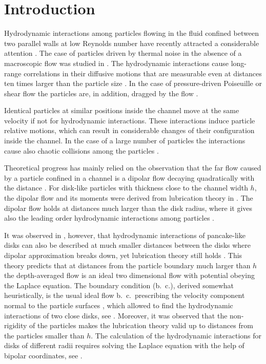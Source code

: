 \section{Introduction}

Hydrodynamic interactions among particles flowing in the fluid confined between two parallel walls at low Reynolds number have recently attracted a considerable attention \citep{carba,d1,d2,d3,d4,d5,d6,d7,anom,7,tlusty,tl2006,tl2012,is,sb,f1,f2,f3,f4,f5,f7,tl2014,tabeling,tab0}. The case of particles driven by thermal noise in the absence of a macroscopic flow was studied in \cite{carba,d1,d2,d3,d4,d5,d6,d7,anom,7,tlusty}. The hydrodynamic interactions cause long-range correlations 
in their diffusive motions 
that are measurable even at distances ten times larger than the particle size \citep{carba,anom}. In the case of
pressure-driven Poiseuille or shear flow the particles are, in addition, dragged by the flow \citep{f1,f2,f3,f4,f5,f7,tl2006,tl2012,tl2014,tabeling,tab0,is}.

Identical particles at similar positions inside the channel move at the same velocity if not for hydrodynamic interactions. These interactions induce particle relative motions, which can result in considerable changes of their configuration inside the channel. 
In the case of a large number of particles the interactions cause also chaotic collisions among the particles \citep{tl2014}.

Theoretical progress has mainly relied on the observation that the far flow caused by a particle confined in a channel is a dipolar flow decaying quadratically with the distance \citep{anom}. For disk-like particles with thickness close to the channel width $h$, the dipolar flow and its moments were derived from lubrication theory in \cite{tlusty}. The dipolar flow holds at distances much larger than the disk radius, where it gives also the leading order hydrodynamic interactions among particles \citep{tlusty,tl2006,tl2012,tl2014}.

It was observed in \cite{tl2012}, however, that hydrodynamic interactions of pancake-like disks can also be described at much smaller distances between the disks where dipolar approximation breaks down, yet lubrication theory still holds \citep{Batchelor,lubr,szeri,bruce}. This theory predicts that at distances from the particle boundary much larger than $h$ the depth-averaged flow is an ideal two dimensional flow with potential obeying the Laplace equation. The boundary condition (b.\ c.), derived somewhat heuristically, is the usual ideal flow b.\ c.\ prescribing  the velocity component normal to the particle surfaces \citep{ll}, which allowed to find the hydrodynamic interactions of two close disks, see \cite{tl2012}. Moreover, it was observed that the non-rigidity of the particles makes the lubrication theory valid up to distances from the particles smaller than $h$. The calculation of the hydrodynamic interactions for disks of different radii requires solving the Laplace equation with the help of bipolar coordinates, see \cite{is}.

